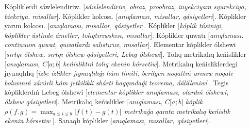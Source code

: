 Kópliklerdi sáwlelendiriw. [\textit{sáwlelendiriw, obraz, proobraz, inyekciyam syurekciya, biekciya, misallar}].
Kóplikler kolcosı. [\textit{anıqlaması, misallar, qásiyetleri}].
Kóplikler yarım kolcosı. [\textit{anıqlaması, mısallar, qásiyetler}].
Kóplikler [\textit{kóplik túsinigi, kóplikler ústinde ámeller, tolıqtırıwshısı, mısallar}].
Kóplikler quwatı [\textit{anıqlaması. continuum quwat, quwatlardı salıstırıw, mısallar}].
Elementar kóplikler ólshewi [\textit{sırtqı ólshew, sırtqı ólshew qásiyetleri, Lebeg ólshewi}].
Tolıq metrikalıq keńislikler [\textit{anıqlaması, \(C\lbrack a;b\rbrack\) keńisliktıń tolıq ekenin kórsetiw}].
Metrikalıq keńisliklerdegi jıynaqlılıq [\textit{izbe-izlikler jıynaqlılıǵı hám limiti, berilgen noqattıń urınıw noqatı bolıwınıń zárúrli hám jetkilikli shárti haqqındaǵi teorema, dálilleniwi}].
Tegis kópliklerdıń Lebeg ólshewi [\textit{elementar kóplikler anıqlaması, olardıń ólshewi, ólshew qásiyetleri}].
Metrikalıq keńislikler [\textit{anıqlaması, \(C\lbrack a;b\rbrack\) kóplik \(\rho(f,g) = \max_{a \leq t \leq b}\left| f(t) - g(t) \right|\) metrikaǵa qarata metrikalıq keńislik ekenin kórsetiw }].
Sanaqlı kóplikler [\textit{anıqlaması, mısallar, qásiyetleri}].